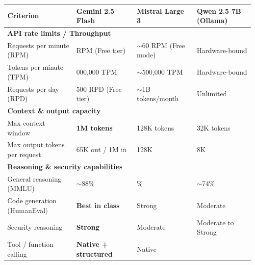 \documentclass[12pt,a4paper]{report}
\begin{document}
\begin{table}[H]
    \centering
    \renewcommand{\arraystretch}{1.45}
    \begin{tabular}{|p{}|
                    >{\centering\arraybackslash}p{}|
                    >{\centering\arraybackslash}p{}|
                    >{\centering\arraybackslash}p{}|}
        \hline
        \textbf{Criterion} & \textbf{Gemini 2.5 Flash} &
        \textbf{Mistral Large 3} & \textbf{Qwen 2.5 7B (Ollama)} \\
        \hline
        \multicolumn{4}{|l|}{\textbf{API rate limits / Throughput}} \\
        \hline
        Requests per minute (RPM) &
        15 RPM (Free tier)~\cite{geminiRateLimits} &
        $\sim$60 RPM (Free mode) &
        Hardware-bound \\
        \hline
        Tokens per minute (TPM) &
        1{,}000{,}000 TPM~\cite{geminiRateLimits} &
        $\sim$500{,}000 TPM &
        Hardware-bound \\
        \hline
        Requests per day (RPD) &
        1{,}500 RPD (Free tier)~\cite{geminiRateLimits} &
        $\sim$1B tokens/month &
        Unlimited \\
        \hline
        \multicolumn{4}{|l|}{\textbf{Context \& output capacity}} \\
        \hline
        Max context window &
        \textbf{1M tokens} & 128K tokens & 32K tokens \\
        \hline
        Max output tokens per request &
        65K out / 1M in & 128K & 8K \\
        \hline
        \multicolumn{4}{|l|}{\textbf{Reasoning \& security capabilities}} \\
        \hline
        General reasoning (MMLU) &
        $\sim$88\%~\cite{llmstatsFlash} &
        84\%~\cite{mistralDocs} &
        $\sim$74\%~\cite{qwen25report} \\
        \hline
        Code generation (HumanEval) &
        \textbf{Best in class}~\cite{llmstatsFlash} &
        Strong~\cite{mistralDocs} &
        Moderate~\cite{qwen25report} \\
        \hline
        Security reasoning &
        \textbf{Strong}~\cite{llmstatsFlash} &
        Moderate~\cite{mistralDocs} &
        Moderate to Strong~\cite{qwen25report} \\
        \hline
        Tool / function calling &
        \textbf{Native + structured}~\cite{llmstatsFlash} &
        Native~\cite{mistralDocs} &

\end{tabular}
\end{table}
\end{document}
